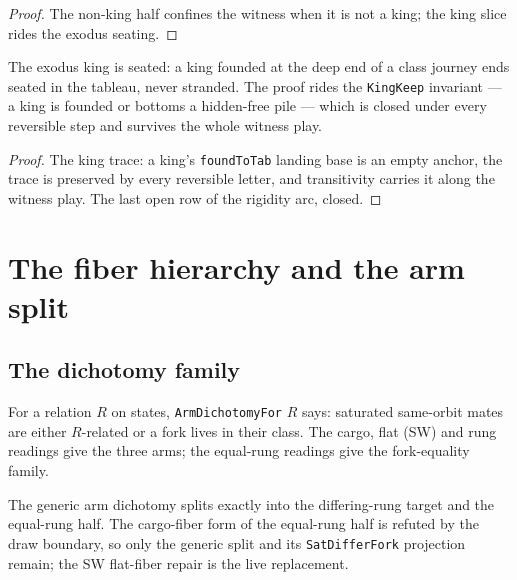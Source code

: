 \begin{proof}
\leanok
{}
The non-king half confines the witness when it is not a king;
the king slice rides the exodus seating.
\end{proof}

\begin{theorem}\label{thm:kingExodus}
\leanok
{}
The exodus king is seated: a king founded at the deep end of a
class journey ends seated in the tableau, never stranded.  The
proof rides the \texttt{KingKeep} invariant --- a king is founded
or bottoms a hidden-free pile --- which is closed under every
reversible step and survives the whole witness play.
\end{theorem}

\begin{proof}
\leanok
{}
The king trace: a king's \texttt{foundToTab} landing base is an
empty anchor, the trace is preserved by every reversible letter,
and transitivity carries it along the witness play.  The last
open row of the rigidity arc, closed.
\end{proof}

\chapter{The fiber hierarchy and the arm split}
\label{chap:fiber}

\section{The dichotomy family}

\begin{definition}\label{def:dichotomy}
\leanok
{}
For a relation $R$ on states, \texttt{ArmDichotomyFor} $R$ says:
saturated same-orbit mates are either $R$-related or a fork lives
in their class.  The cargo, flat (SW) and rung readings give the
three arms; the equal-rung readings give the fork-equality
family.
\end{definition}

\begin{theorem}\label{thm:armSplit}
\leanok
{}
The generic arm dichotomy splits exactly into the differing-rung target
and the equal-rung half.  The cargo-fiber form of the equal-rung half is
refuted by the draw boundary, so only the generic split and its
\texttt{SatDifferFork} projection remain; the SW flat-fiber repair is the
live replacement.
\end{theorem}

